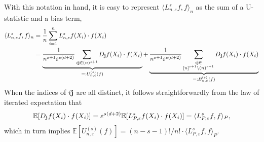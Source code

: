 \documentclass[aos]{imsart}
\theoremstyle{plain}
\theoremstyle{definition}
\theoremstyle{remark}
\newcommand{\dotp}[2]{\langle #1, #2 \rangle}
\newcommand{\1}{\mathbf{1}}
\newcommand{\bj}{{\bf j}}
\begin{document}
With this notation in hand, it is easy to represent $\dotp{L_{n,\varepsilon}^sf}{f}_{n}$ as the sum of a U-statistic and a bias term,
\begin{align*}
\dotp{L_{n,\varepsilon}^sf}{f}_{n} & = \frac{1}{n} \sum_{i = 1}^{n} L_{n,\varepsilon}^sf(X_i) \cdot f(X_i) \\
& = \underbrace{\frac{1}{n^{s + 1}\varepsilon^{s(d + 2)}} \sum_{{i\bf j} \in (n)^{s + 1}}D_{\bj}f(X_i) \cdot f(X_i)}_{=:U_{n,\varepsilon}^{(s)}(f)} + \underbrace{\frac{1}{n^{s + 1}\varepsilon^{s(d + 2)}} \sum_{\substack{i\bj \in \\ [n]^{s + 1}\setminus (n)^{s + 1}}} D_{\bj}f(X_i) \cdot f(X_i)}_{=:B_{n,\varepsilon}^{(s)}(f)}
\end{align*}
When the indices of $i\bj$ are all distinct, it follows straightforwardly from the law of iterated expectation that
\begin{equation*}
\mathbb{E}[ D_{\bj}f(X_i) \cdot f(X_i)] = \varepsilon^{s(d + 2)}\mathbb{E}[L_{P,\varepsilon}^sf(X_i) \cdot f(X_i)] = \dotp{L_{P,\varepsilon}^sf}{f}_{P}, 
\end{equation*}
which in turn implies $\mathbb{E}[U_{n,\varepsilon}^{(s)}(f)] = (n - s - 1)!/n! \cdot \dotp{L_{P,\varepsilon}^sf}{f}_P$. 
\end{document}
